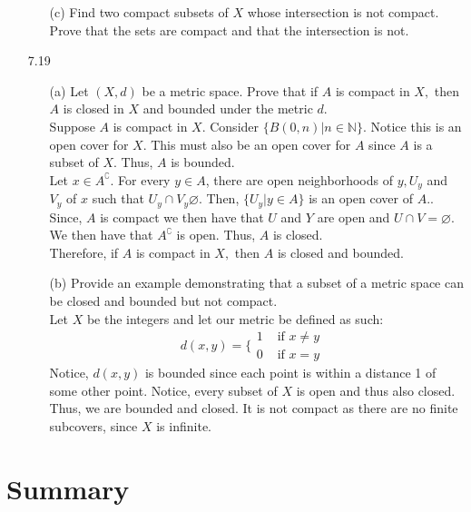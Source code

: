 \documentclass[12pt]{article}
\begin{document}
\begin{enumerate}
\begin{enumerate}
			\item[(c)] Find two compact subsets of $X$ whose intersection is not compact. Prove
			that the sets are compact and that the intersection is not.
			
		\end{enumerate}
		
		\item[7.19] \begin{enumerate}
			\item[(a)] Let $( X , d )$ be a metric space. Prove that if $A$ is compact in $X ,$ then $A$ is closed in $X$ and bounded under the metric $d .$\\
			Suppose $ A $ is compact in $ X $.  Consider $\{B(0,n)|n\in \mathbb{N}\} $. Notice this is an open cover for $ X $. This must also be an open cover for $ A $ since $ A $ is a subset of $ X $. Thus, $ A $ is bounded.\\
			Let $ x \in A^\complement $. For every $ y \in A $, there are open neighborhoods of  $y, U_y $ and $ V_y $ of $ x $ such that $ U_y \cap V_y \varnothing $. Then, $ \{U_y|y\in A\} $ is an open cover of $ A. $. Since, $ A $ is compact we then have that $ U $ and $ Y $ are open and $ U\cap V = \varnothing$. We then have that $ A^\complement$ is open. Thus, $ A $ is closed.\\
			Therefore, if $A$ is compact in $X ,$ then $A$ is closed and bounded.
			\item[(b)] Provide an example demonstrating that a subset of a metric space can be
			closed and bounded but not compact.\\
			
			Let $ X $ be the integers and let our metric be defined as such:
				\[d(x,y) = \{\begin{array} {ll} {1} & {\text{ if  $x \neq y$ }} \\ {0} & {\text { if $x = y$}} \end{array}\]
			Notice, $ d(x,y) $ is bounded since each point is within a distance 1 of some other point. Notice, every subset of $ X $ is open and thus also closed. Thus, we are bounded and closed. It is not compact as there are no finite subcovers, since $ X $ is infinite.
		\end{enumerate}
	\end{enumerate}
	\section*{Summary}
\end{document}
